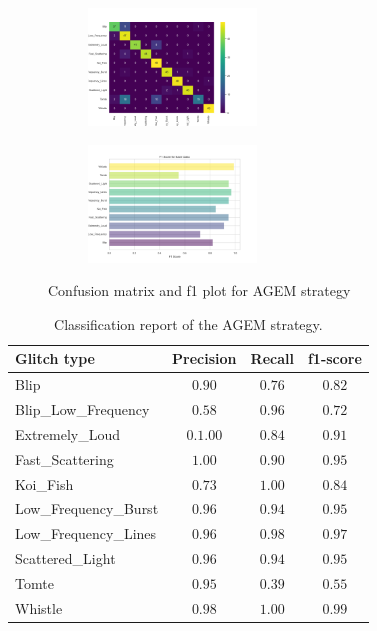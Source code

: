 \begin{figure}[H]
\centering
\begin{subfigure}
  \centering
  \includegraphics[width=0.49\textwidth]{Images/cm_AGEM_MultiView_100epochs.png}  
  \label{fig:sub-first3}
\end{subfigure}
\begin{subfigure}
  \centering
  \includegraphics[width=0.49\textwidth]{Grad Assignment/Images/f1_AGEM_MultiView_100epochs.png}  
  \label{fig:sub-second3}
\end{subfigure}
\caption{Confusion matrix and f1 plot for AGEM strategy}
\label{fig:cm_f1_agem_baseline}
\end{figure}

\begin{table}
\centering

    \begin{tabular}{|l|c c c|}
    \hline
    \textbf{Glitch type} & \textbf{Precision} & \textbf{Recall} & \textbf{f1-score} \\ \hline
    Blip & $0.90$ & $0.76$ & $0.82$ \\
    Blip\_Low\_Frequency & $0.58$ & $0.96$ & $0.72$\\
    Extremely\_Loud & $0.1.00$ & $0.84$ &  $0.91$\\
    Fast\_Scattering & $1.00$ & $0.90$ &  $0.95$\\
    Koi\_Fish & $0.73$ & $1.00$ & $0.84$\\
    Low\_Frequency\_Burst & $0.96$ & $0.94$ & $0.95$\\
    Low\_Frequency\_Lines & $0.96$ & $0.98$ & $0.97$\\
    Scattered\_Light & $0.96$ & $0.94$ &$0.95$ \\
    Tomte & $0.95$ & $0.39$ &$0.55$ \\
    Whistle & $0.98$ & $1.00$ & $0.99$ \\
    \hline
    \end{tabular}
    \caption{Classification report of the AGEM strategy.}
    \label{tbl:RQ1_class_report_agem}
\end{table}

